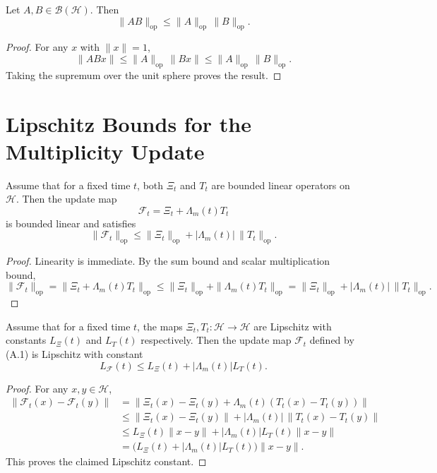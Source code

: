 \documentclass[11pt]{article}
\begin{document}
\begin{lemma}
Let $A,B\in\mathcal{B}(\mathcal{H})$. Then
\[
\|AB\|_{\mathrm{op}} \le \|A\|_{\mathrm{op}}\,\|B\|_{\mathrm{op}}.
\]
\end{lemma}

\begin{proof}
For any $x$ with $\|x\|=1$,
\[
\|ABx\| \le \|A\|_{\mathrm{op}}\,\|Bx\| \le \|A\|_{\mathrm{op}}\,\|B\|_{\mathrm{op}}.
\]
Taking the supremum over the unit sphere proves the result.
\end{proof}

\section{Lipschitz Bounds for the Multiplicity Update}

\begin{proposition}
Assume that for a fixed time $t$, both $\Xi_t$ and $T_t$ are bounded linear operators on $\mathcal{H}$. Then the update map
\[
\mathcal{F}_t = \Xi_t + \Lambda_m(t)T_t
\]
is bounded linear and satisfies
\[
\|\mathcal{F}_t\|_{\mathrm{op}} \le \|\Xi_t\|_{\mathrm{op}} + |\Lambda_m(t)|\,\|T_t\|_{\mathrm{op}}. \tag{A.2}
\]
\end{proposition}

\begin{proof}
Linearity is immediate. By the sum bound and scalar multiplication bound,
\[
\|\mathcal{F}_t\|_{\mathrm{op}}
= \|\Xi_t + \Lambda_m(t)T_t\|_{\mathrm{op}}
\le \|\Xi_t\|_{\mathrm{op}} + \|\Lambda_m(t)T_t\|_{\mathrm{op}}
= \|\Xi_t\|_{\mathrm{op}} + |\Lambda_m(t)|\,\|T_t\|_{\mathrm{op}}.
\]
\end{proof}

\begin{proposition}
Assume that for a fixed time $t$, the maps $\Xi_t,T_t:\mathcal{H}\to\mathcal{H}$ are Lipschitz with constants $L_{\Xi}(t)$ and $L_T(t)$ respectively. Then the update map $\mathcal{F}_t$ defined by \textup{(A.1)} is Lipschitz with constant
\[
L_{\mathcal{F}}(t) \le L_{\Xi}(t) + |\Lambda_m(t)|L_T(t). \tag{A.3}
\]
\end{proposition}

\begin{proof}
For any $x,y\in\mathcal{H}$,
\begin{align*}
\|\mathcal{F}_t(x)-\mathcal{F}_t(y)\|
&= \|\Xi_t(x)-\Xi_t(y) + \Lambda_m(t)(T_t(x)-T_t(y))\| \\
&\le \|\Xi_t(x)-\Xi_t(y)\| + |\Lambda_m(t)|\,\|T_t(x)-T_t(y)\| \\
&\le L_{\Xi}(t)\|x-y\| + |\Lambda_m(t)|L_T(t)\|x-y\| \\
&= \bigl(L_{\Xi}(t)+|\Lambda_m(t)|L_T(t)\bigr)\|x-y\|.
\end{align*}
This proves the claimed Lipschitz constant.
\end{proof}
\end{document}
